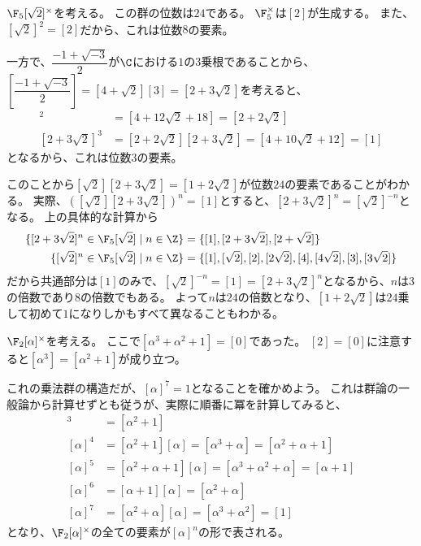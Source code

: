\documentclass[uplatex]{jsarticle}
\begin{document}
\begin{eg}
  $\F_5[\sqrt{2}]^\times$を考える。
  この群の位数は$24$である。
  $\F_5^\times$は$[2]$が生成する。
  また、$[\sqrt{2}]^2=[2]$だから、これは位数$8$の要素。

  一方で、$\dfrac{-1+\sqrt{-3}}{2}$が$\C$における$1$の$3$乗根であることから、
  $[\dfrac{-1+\sqrt{-3}}{2}]=[4+\sqrt{2}][3]=[2+3\sqrt{2}]$を考えると、
  \begin{align*}
    [2+3\sqrt{2}]^2&=[4+12\sqrt{2}+18]=[2+2\sqrt{2}]\\
    [2+3\sqrt{2}]^3&=[2+2\sqrt{2}][2+3\sqrt{2}]=[4+10\sqrt{2}+12]=[1]
  \end{align*}  
  となるから、これは位数$3$の要素。

  このことから$[\sqrt{2}][2+3\sqrt{2}]=[1+2\sqrt{2}]$が位数$24$の要素であることがわかる。
  実際、$([\sqrt{2}][2+3\sqrt{2}])^n=[1]$とすると、$[2+3\sqrt{2}]^n=[\sqrt{2}]^{-n}$となる。
  上の具体的な計算から
  \begin{align*}
    \{[2+3\sqrt{2}]^n\in\F_5[\sqrt{2}]\mid n\in\Z\}&=\{[1],[2+3\sqrt{2}],[2+\sqrt{2}]\}\\
    \{[\sqrt{2}]^n\in\F_5[\sqrt{2}]\mid n\in\Z\}&=\{[1],[\sqrt{2}],[2],[2\sqrt{2}],[4],[4\sqrt{2}],[3],[3\sqrt{2}]\}
  \end{align*}
  だから共通部分は$[1]$のみで、$[\sqrt{2}]^{-n}=[1]=[2+3\sqrt{2}]^n$となるから、$n$は$3$の倍数であり$8$の倍数でもある。
  よって$n$は$24$の倍数となり、$[1+2\sqrt{2}]$は$24$乗して初めて$1$になりしかもすべて異なることもわかる。
\end{eg}

\begin{eg}
  $\F_2[\alpha]^\times$を考える。
  ここで$[\alpha^3+\alpha^2+1]=[0]$であった。
  $[2]=[0]$に注意すると$[\alpha^3]=[\alpha^2+1]$が成り立つ。

  これの乗法群の構造だが、$[\alpha]^7=1$となることを確かめよう。
  これは群論の一般論から計算せずとも従うが、実際に順番に冪を計算してみると、
  \begin{align*}
    [\alpha]^3&=[\alpha^2+1]\\
    [\alpha]^4&=[\alpha^2+1][\alpha]=[\alpha^3+\alpha]=[\alpha^2+\alpha+1]\\
    [\alpha]^5&=[\alpha^2+\alpha+1][\alpha]=[\alpha^3+\alpha^2+\alpha]=[\alpha+1]\\
    [\alpha]^6&=[\alpha+1][\alpha]=[\alpha^2+\alpha]\\
    [\alpha]^7&=[\alpha^2+\alpha][\alpha]=[\alpha^3+\alpha^2]=[1]
  \end{align*}
  となり、$\F_2[\alpha]^\times$の全ての要素が$[\alpha]^n$の形で表される。
\end{eg}
\end{document}
